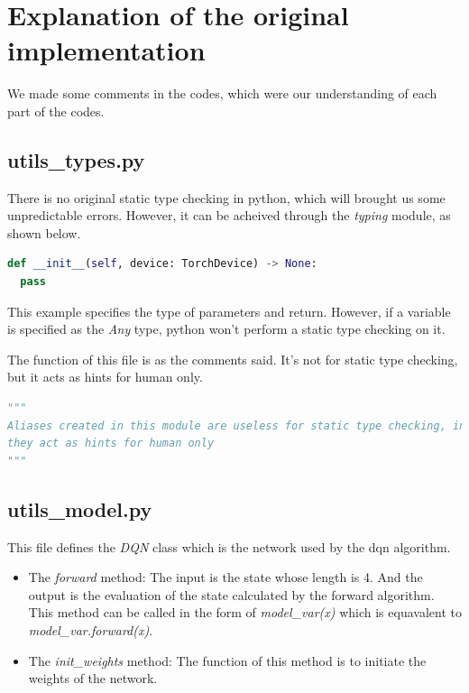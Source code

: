 \documentclass[a4paper, 11pt]{article}
\begin{document}
\section{Explanation of the original implementation}
We made some comments in the codes,
which were our understanding of each part of the codes.
\subsection{utils\_types.py}
There is no original static type checking in python,
which will brought us some unpredictable errors.
However, it can be acheived through the \emph{typing} module,
as shown below.
\begin{lstlisting}[language=python]
def __init__(self, device: TorchDevice) -> None:
  pass
\end{lstlisting}
This example specifies the type of parameters and return.
However, if a variable is specified as the \emph{Any} type,
python won't perform a static type checking on it.

The function of this file is as the comments said.
It's not for static type checking,
but it acts as hints for human only.
\begin{lstlisting}[language=python]
"""
Aliases created in this module are useless for static type checking, instead,
they act as hints for human only
"""
\end{lstlisting}


\subsection{utils\_model.py}
This file defines the \emph{DQN} class
which is the network used by the dqn algorithm.
\begin{itemize}\setlength{\itemsep}{-\itemsep}
      \item The \emph{forward} method:
            The input is the state whose length is 4.
            And the output is the evaluation of the state
            calculated by the forward algorithm.
            This method can be called in the form of
            \emph{model\_var(x)} which is equavalent to \emph{model\_var.forward(x)}.
      \item The \emph{init\_weights} method:
            The function of this method is to initiate the weights of the network.
\end{itemize}
\end{document}
